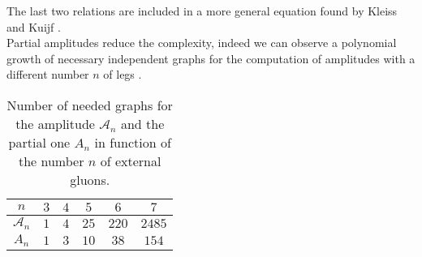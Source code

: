 The last two relations are included in a more general equation found by Kleiss and Kuijf \cite{Kleiss:1988ne}.\\
Partial amplitudes reduce the complexity, indeed we can observe a polynomial growth of necessary independent graphs for the computation of amplitudes with a different number $n$ of legs \cite{Badger:2016uuq}.
\begin{table}[H]
\centering
 \begin{tabular}{|| c | c c c c c||} 
 \hline
 $n$ & $3$ & $4$ & $5$ & $6$ & $7$ \\ [0.5ex] 
 \hline\hline
 $\mathcal{A}_n$ & $1$ &$4$ &$25$ & $220$ & $2485$ \\ 
 \hline\hline
  $A_n$ & $1$ &$3$ &$10$ & $38$ & $154$ \\ 
 \hline
 \end{tabular}
 \caption{\label{tab:FCounting}Number of needed graphs for the amplitude $\mathcal{A}_n$ and the partial one $A_n$ in function of the number $n$ of external gluons.}
\end{table}
